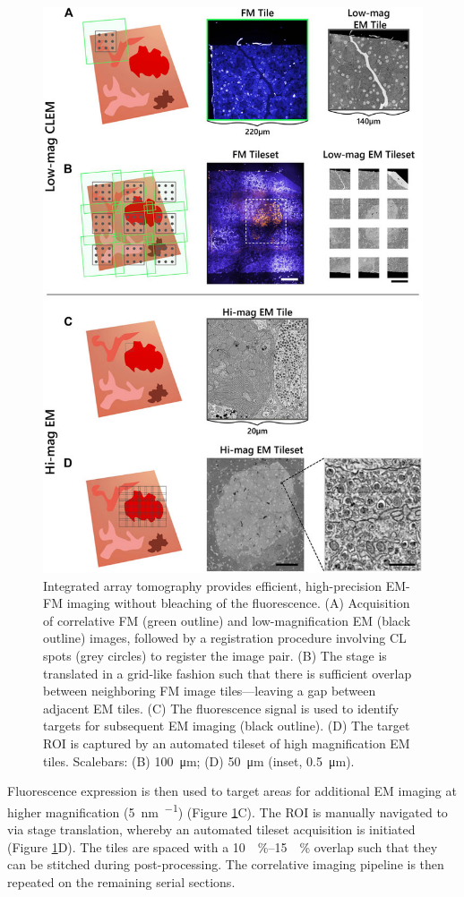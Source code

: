 \begin{figure}[!tb]
    \centering
    \includegraphics[width=0.78\linewidth]{chapter-3/figures_JPEG_LQ/fig3-2_acq-strat.jpg}
    \caption{Integrated array tomography provides efficient, high-precision EM-FM imaging without bleaching of the fluorescence.
    (A) Acquisition of correlative FM (green outline) and low-magnification EM (black outline) images, followed by a registration procedure involving CL spots (grey circles) to register the image pair.
    (B) The stage is translated in a grid-like fashion such that there is sufficient overlap between neighboring FM image tiles—leaving a gap between adjacent EM tiles.
    (C) The fluorescence signal is used to identify targets for subsequent EM imaging (black outline).
    (D) The target ROI is captured by an automated tileset of high magnification EM tiles.
    Scalebars: (B) \SI{100}{\micro\meter}; (D) \SI{50}{\micro\meter} (inset, \SI{0.5}{\micro\meter}).}
    \label{fig:3.2_acqstrat}
\end{figure}

Fluorescence expression is then used to target areas for additional EM imaging at higher magnification (\SI{5}{\nano\meter\per\pixel}) (Figure \ref{fig:3.2_acqstrat}C). The ROI is manually navigated to via stage translation, whereby an automated tileset acquisition is initiated (Figure \ref{fig:3.2_acqstrat}D). The tiles are spaced with a \SIrange{10}{15}{\!\%} overlap such that they can be stitched during post-processing. The correlative imaging pipeline is then repeated on the remaining serial sections.


